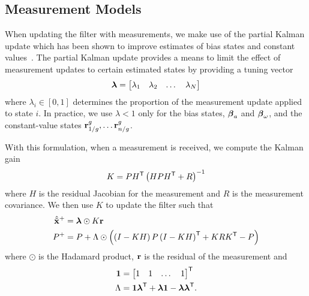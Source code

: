 
\subsection{Measurement Models}
\label{sec:measurement_models}

When
updating the filter with measurements, we make use of the partial Kalman update
which has been shown to improve estimates of bias states and constant values~\cite{brink2017partial}. The partial Kalman update provides a
means to limit the effect of measurement updates to certain estimated
states by providing a tuning vector
\begin{equation}
  \boldsymbol{\mathrm{\lambda}} =
\begin{bmatrix}
  \lambda_1 & \lambda_2 & \dots & \lambda_N
\end{bmatrix}
\end{equation}
where $\lambda_i \in \left[ 0, 1\right]$ determines the proportion of the
measurement update applied to state $i$.
In practice, we use $\lambda < 1$ only for the
bias states, $\boldsymbol{\mathrm{\beta}}_a$ and $\boldsymbol{\mathrm{\beta}}_\omega$, and the
constant-value states $\vect{r}_{1/g}^{g}, \dots \vect{r}_{n/g}^{g}$.

With this formulation,
when a measurement is received, we compute the Kalman gain
\begin{equation}
  K = P H^{\mathsf{T}} \left(H P H^{\mathsf{T}} + R \right)^{-1}
\end{equation}
where $H$ is the residual Jacobian for the measurement and $R$ is the
measurement covariance. We then use $K$ to update the filter such that
\begin{align}
  \hat{\tilde{\boldsymbol{\mathrm{x}}}}^{+} &= \boldsymbol{\mathrm{\lambda}} \odot K \boldsymbol{\mathrm{r}} \\
  P^{+} &= P + \Lambda \odot \left( \left(I - K H \right) P \left(I - K H
  \right)^{\mathsf{T}} + K R K^{\mathsf{T}} - P \right)
\end{align}
where $\odot$ is the Hadamard product, $\boldsymbol{\mathrm{r}}$ is the residual of the
measurement and
\begin{align}
  \boldsymbol{\mathrm{1}} &= \begin{bmatrix} 1 & 1 & \dots & 1 \end{bmatrix}^{\mathsf{T}} \\
  \Lambda &= \boldsymbol{\mathrm{1}} \boldsymbol{\mathrm{\lambda}}^{\mathsf{T}} + \boldsymbol{\mathrm{\lambda}} \boldsymbol{\mathrm{1}} -
  \boldsymbol{\mathrm{\lambda}} \boldsymbol{\mathrm{\lambda}}^{\mathsf{T}}.
\end{align}

